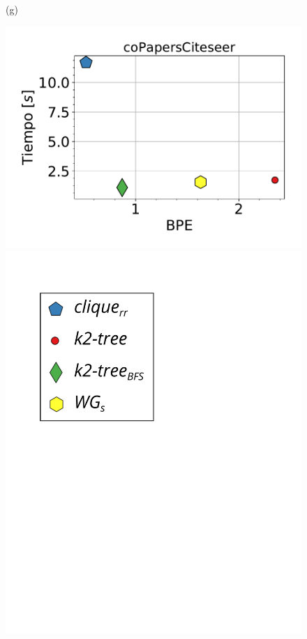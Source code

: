 \begin{figure}
\begin{minipage}{1\textwidth}
\begin{minipage}{0.45\textwidth}
    			(g)
    		\end{minipage}
    		\begin{minipage}{0.45\textwidth}
    			\centering
    			\begin{minipage}{0.75\textwidth}
    				\centering
    				\includegraphics[width=1\linewidth]{img/bpeTimes/secuencial/coPapersCiteseer.pdf}
    			\end{minipage}
    			\begin{minipage}{0.2\textwidth}
    				\centering
    				\includegraphics[scale=.2, clip, trim=60 194 0 0]{img/bpeTimes/labelSec.pdf}
    			\end{minipage}
    			

\end{minipage}
\end{minipage}
\end{figure}
